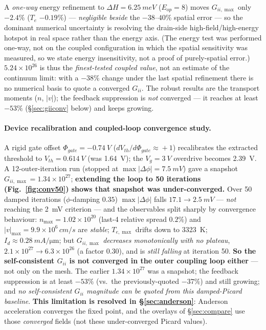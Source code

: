 \documentclass[11pt]{article}
\begin{document}
A \emph{one-way} energy refinement to $\Delta H=\SI{6.25}{meV}$ ($E_{op}=8$) moves $G_{ii,\max}$
only $-2.4\%$ ($T_e$ $-0.19\%$) --- \emph{negligible beside} the $-38$--$40\%$ spatial error --- so
the dominant numerical uncertainty is resolving the drain-side high-field/high-energy hotspot in
real space rather than the energy axis. (The energy test was performed one-way, not on the coupled
configuration in which the spatial sensitivity was measured, so we state energy insensitivity, not
a proof of purely-spatial error.) $5.24\times10^{26}$ is thus the \emph{finest-tested coupled
value}, not an estimate of the continuum limit: with a $-38\%$ change under the last spatial
refinement there is no numerical basis to quote a converged $G_{ii}$. The robust results are the
transport moments ($n$, $|v|$); the feedback suppression is \emph{not} converged --- it reaches at
least $-53\%$ (\S\ref{sec:giiconv} below) and keeps growing.

\paragraph{Device recalibration and coupled-loop convergence study.} A rigid gate offset
$\Phi_{gate}=\SI{-0.74}{V}$ ($dV_{th}/d\Phi_{gate}\!\approx\!+1$) recalibrates the extracted
threshold to $V_{th}=\SI{0.614}{V}$ (was \SI{1.64}{V}); the $V_g=\SI{3}{V}$ overdrive becomes
\SI{2.39}{V}. A 12-outer-iteration run (stopped at $\max|\Delta\phi|=\SI{7.5}{mV}$) gave a snapshot
$G_{ii,\max}=1.34\times10^{27}$; \textbf{extending the loop to 50 iterations
(Fig.~\ref{fig:conv50}) shows that snapshot was under-converged.} Over 50 damped iterations
($\phi$-damping $0.35$) $\max|\Delta\phi|$ falls $17.1\to\SI{2.5}{mV}$ --- \emph{not} reaching the
\SI{2}{mV} criterion --- and the observables split sharply by convergence behaviour:
$n_{\max}=1.02\times10^{20}$ (last-4 relative spread $0.2\%$) and $|v|_{\max}=9.9\times10^{6}\,
\si{cm/s}$ are \emph{stable}; $T_{e,\max}$ drifts down to \SI{3323}{K}; $I_d\approx
\SI{0.28}{mA/\micro\meter}$; but $G_{ii,\max}$ \emph{decreases monotonically with no plateau},
$2.1\times10^{27}\to6.3\times10^{26}$ (a factor $0.30$), and is \emph{still falling} at iteration 50.
\textbf{So the self-consistent $G_{ii}$ is not converged in the outer coupling loop either} --- not
only on the mesh. The earlier $1.34\times10^{27}$ was a snapshot; the feedback suppression is at
least $-53\%$ (vs.\ the previously-quoted $-37\%$) and still growing; and \emph{no self-consistent
$G_{ii}$ magnitude can be quoted from this damped-Picard baseline}. \textbf{This limitation is
resolved in \S\ref{sec:anderson}}: Anderson acceleration converges the fixed point, and the overlays
of \S\ref{sec:compare} use those \emph{converged} fields (not these under-converged Picard values).
\end{document}
